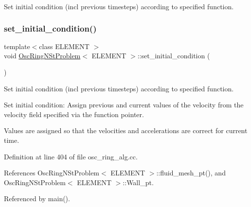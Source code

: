 Set initial condition (incl previous timesteps) according to specified function. 

\mbox{\label{classOscRingNStProblem_ab1f2083699d00da4b7f6116e10792e86}} 
\subsubsection{\texorpdfstring{set\+\_\+initial\+\_\+condition()}{set\_initial\_condition()}\hspace{0.1cm}{\footnotesize\ttfamily [2/2]}}
{\footnotesize\ttfamily template$<$class E\+L\+E\+M\+E\+NT $>$ \\
void \hyperlink{classOscRingNStProblem}{Osc\+Ring\+N\+St\+Problem}$<$ E\+L\+E\+M\+E\+NT $>$\+::set\+\_\+initial\+\_\+condition (\begin{DoxyParamCaption}{ }\end{DoxyParamCaption})}



Set initial condition (incl previous timesteps) according to specified function. 

Set initial condition\+: Assign previous and current values of the velocity from the velocity field specified via the function pointer.

Values are assigned so that the velocities and accelerations are correct for current time. 

Definition at line 404 of file osc\+\_\+ring\+\_\+alg.\+cc.



References Osc\+Ring\+N\+St\+Problem$<$ E\+L\+E\+M\+E\+N\+T $>$\+::fluid\+\_\+mesh\+\_\+pt(), and Osc\+Ring\+N\+St\+Problem$<$ E\+L\+E\+M\+E\+N\+T $>$\+::\+Wall\+\_\+pt.



Referenced by main().

\mbox{\label{classOscRingNStProblem_a00e957fb6a313a9c1de784d0fa3a7a36}} 
